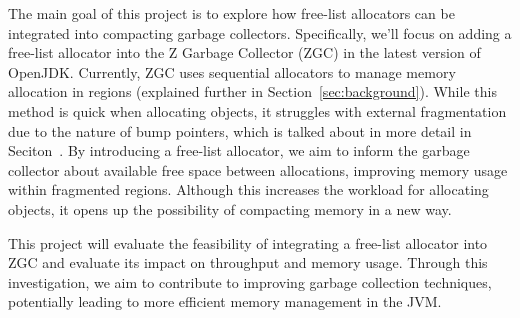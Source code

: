 The main goal of this project is to explore how free-list allocators can be integrated into compacting garbage collectors. Specifically, we'll focus on adding a free-list allocator into the Z Garbage Collector (ZGC) in the latest version of OpenJDK. Currently, ZGC uses sequential allocators to manage memory allocation in regions (explained further in Section~\ref{sec:background}). While this method is quick when allocating objects, it struggles with external fragmentation due to the nature of bump pointers, which is talked about in more detail in Seciton~\cite{background:memorymanagement}. By introducing a free-list allocator, we aim to inform the garbage collector about available free space between allocations, improving memory usage within fragmented regions. Although this increases the workload for allocating objects, it opens up the possibility of compacting memory in a new way.

This project will evaluate the feasibility of integrating a free-list allocator into ZGC and evaluate its impact on throughput and memory usage. Through this investigation, we aim to contribute to improving garbage collection techniques, potentially leading to more efficient memory management in the JVM.
